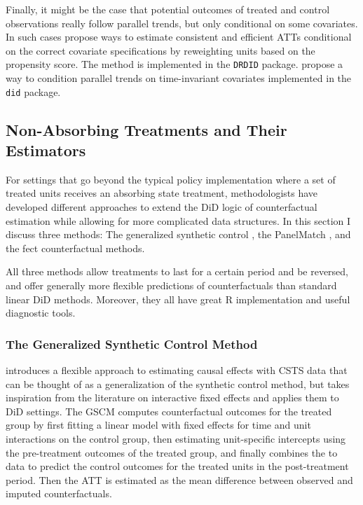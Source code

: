\documentclass[hidelinks]{article}\usepackage[]{graphicx}\usepackage[]{xcolor}
\begin{document}
Finally, it might be the case that potential outcomes of treated and control observations really follow parallel trends, but only conditional on some covariates. In such cases \textcite{SantAnna2020} propose ways to estimate consistent and efficient ATTs conditional on the correct covariate specifications by reweighting units based on the propensity score. The method is implemented in the \texttt{DRDID} package.
\textcite{Callaway2021} propose a way to condition parallel trends on time-invariant covariates implemented in the \texttt{did} package.


\subsection{Non-Absorbing Treatments and Their Estimators}

For settings that go beyond the typical policy implementation where a set of treated units receives an absorbing state treatment, methodologists have developed different approaches to extend the DiD logic of counterfactual estimation while allowing for more complicated data structures. In this section I discuss three methods: The generalized synthetic control \parencite[GSCM]{Xu2017}, the PanelMatch \parencite{Imai2021, Kim2021}, and the fect \parencite{Liu} counterfactual methods.

All three methods allow treatments to last for a certain period and be reversed, and offer generally more flexible predictions of counterfactuals than standard linear DiD methods. Moreover, they all have great R implementation and useful diagnostic tools.

\subsubsection{The Generalized Synthetic Control Method}

\textcite{Xu2017} introduces a flexible approach to estimating causal effects with CSTS data that can be thought of as a generalization of the synthetic control method, but takes inspiration from the literature on interactive fixed effects \parencite{Bai2009} and applies them to DiD settings. The GSCM computes counterfactual outcomes for the treated group by first fitting a linear model with fixed effects for time and unit interactions on the control group, then estimating unit-specific intercepts using the pre-treatment outcomes of the treated group, and finally combines the to data to predict the control outcomes for the treated units in the post-treatment period. Then the ATT is estimated as the mean difference between observed and imputed counterfactuals.
\end{document}
